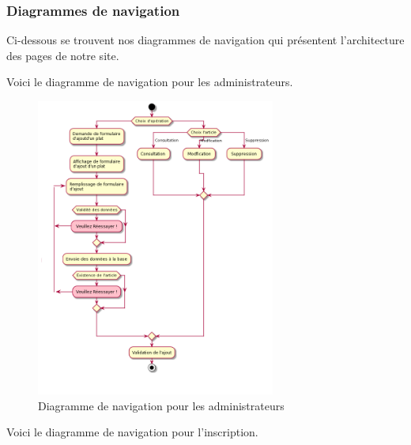 \clearpage

\subsubsection{Diagrammes de navigation}
Ci-dessous se trouvent nos diagrammes de navigation qui présentent l'architecture des pages de notre site.

Voici le diagramme de navigation pour les administrateurs.

\begin{figure}[H]
\begin{centering}
\includegraphics[width=0.7\textwidth,height=0.8\textheight]{Ressources/Administrateur_navigation.png}
\caption{Diagramme de navigation pour les administrateurs}
\par
\end{centering}
\end{figure}

\clearpage

Voici le diagramme de navigation pour l'inscription.

